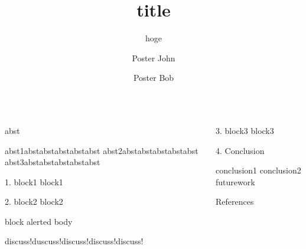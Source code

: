 \documentclass[final,14pt]{beamer}
\title{title}
\subtitle{hoge}
\author{Poster John \inst{1} \and Poster Bob \inst{2}}
\institute[shortinst]{\inst{1} Poster Univ.}
\institute[shortinst]{\inst{2} NicePoster Univ.}
\begin{document}
\begin{frame}[t]
\begin{columns}[t]
\separatorcolumn


\begin{column}{\colwidth}

  \begin{alertblock}{abst}
    \begin{itemize}
      \okitem abst1abstabstabstabstabst
      \okitem abst2abstabstabstabstabst
      \okitem abst3abstabstabstabstabst
    \end{itemize}
  \end{alertblock}


  \begin{block}{1. block1}
    block1
  \end{block}
  \begin{block}{2. block2}
    block2\\
      \vspace{1em}
      \begin{beamercolorbox}[colsep*=0.5em]{block alerted body}
       \vspace{-0.5em}
       \begin{itemize}
           \exitem discuss!duscuss!discuss!discuss!discuss!
       \end{itemize}
      \end{beamercolorbox}
  \end{block}

\end{column}

\separatorcolumn

\begin{column}{\colwidth}

  \begin{block}{3. block3} 
    block3
  \end{block}

  \begin{block}{4. Conclusion}
      \begin{itemize}
          \okitem conclusion1
          \okitem conclusion2
          \exitem futurework
      \end{itemize}
  \end{block}
 
  \vspace{-1em}

  \begin{block}{References}

    \nocite{*}
    \footnotesize{}

  \end{block}

\end{column}
\separatorcolumn



\end{columns}
\end{frame}
\end{document}
